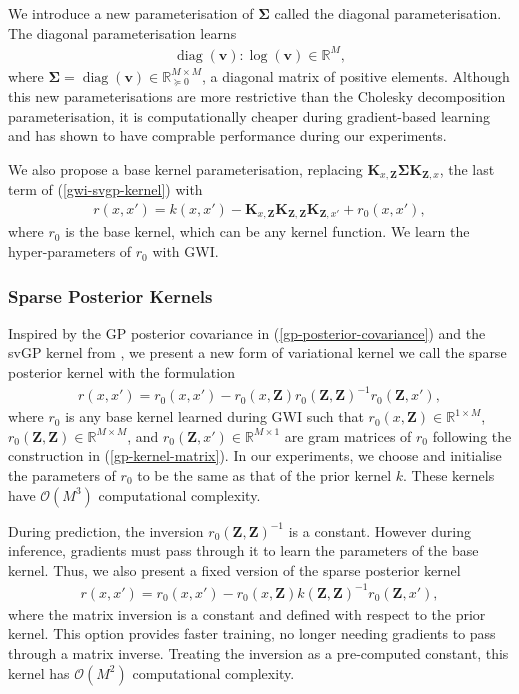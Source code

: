 \documentclass{article}
\newcommand{\diag}{\operatorname{diag}}
\numberwithin{equation}{section}
\begin{document}
We introduce a new parameterisation of $\mathbf{\Sigma}$ called the diagonal parameterisation. The diagonal parameterisation learns
\begin{align}
    \diag(\mathbf{v}): \log(\mathbf{v}) \in \mathbb{R}^M,
\end{align}
where $\mathbf{\Sigma} = \diag(\mathbf{v}) \in \mathbb{R}^{M \times M}_{\succcurlyeq 0}$, a diagonal matrix of positive elements. Although this new parameterisations are more restrictive than the Cholesky decomposition parameterisation, it is computationally cheaper during gradient-based learning and has shown to have comprable performance during our experiments.

We also propose a base kernel parameterisation, replacing $\mathbf{K}_{x, \mathbf{Z}} \mathbf{\Sigma} \mathbf{K}_{\mathbf{Z}, x}$, the last term of (\ref{gwi-svgp-kernel}) with
\begin{align}
    r(x, x') = k(x, x') - \mathbf{K}_{x, \mathbf{Z}} \mathbf{K}_{\mathbf{Z}, \mathbf{Z}} \mathbf{K}_{\mathbf{Z}, x'} + r_0(x, x'),
    \label{gwi-svgp-kernel}
\end{align}
where $r_0$ is the base kernel, which can be any kernel function. We learn the hyper-parameters of $r_0$ with GWI.

\subsubsection{Sparse Posterior Kernels}
Inspired by the GP posterior covariance in (\ref{gp-posterior-covariance}) and the svGP kernel from \cite{titsias2009variational}, we present a new form of variational kernel we call the sparse posterior kernel with the formulation
\begin{align}
    r(x, x') = r_0(x, x') - r_0\left(x, \mathbf{Z}\right) r_0\left(\mathbf{Z}, \mathbf{Z}\right)^{-1} r_0\left(\mathbf{Z}, x'\right),
\end{align}
where $r_0$ is any base kernel learned during GWI such that $r_0\left(x, \mathbf{Z}\right) \in \mathbb{R}^{1 \times M}$, $r_0\left(\mathbf{Z}, \mathbf{Z}\right) \in \mathbb{R}^{M \times M}$, and $r_0\left(\mathbf{Z}, x'\right) \in \mathbb{R}^{M \times 1}$ are gram matrices of $r_0$ following the construction in (\ref{gp-kernel-matrix}).
In our experiments, we choose and initialise the parameters of $r_0$ to be the same as that of the prior kernel $k$.
These kernels have $\mathcal{O}(M^3)$ computational complexity.

During prediction, the inversion $r_0\left(\mathbf{Z}, \mathbf{Z}\right)^{-1}$ is a constant. However during inference, gradients must pass through it to learn the parameters of the base kernel. Thus, we also present a fixed version of the sparse posterior kernel
\begin{align}
    r(x, x') = r_0(x, x') - r_0\left(x, \mathbf{Z}\right) k\left(\mathbf{Z}, \mathbf{Z}\right)^{-1} r_0\left(\mathbf{Z}, x'\right),
\end{align}
where the matrix inversion is a constant and defined with respect to the prior kernel. This option provides faster training, no longer needing gradients to pass through a matrix inverse. Treating the inversion as a pre-computed constant, this kernel has $\mathcal{O}(M^2)$ computational complexity.
\end{document}
